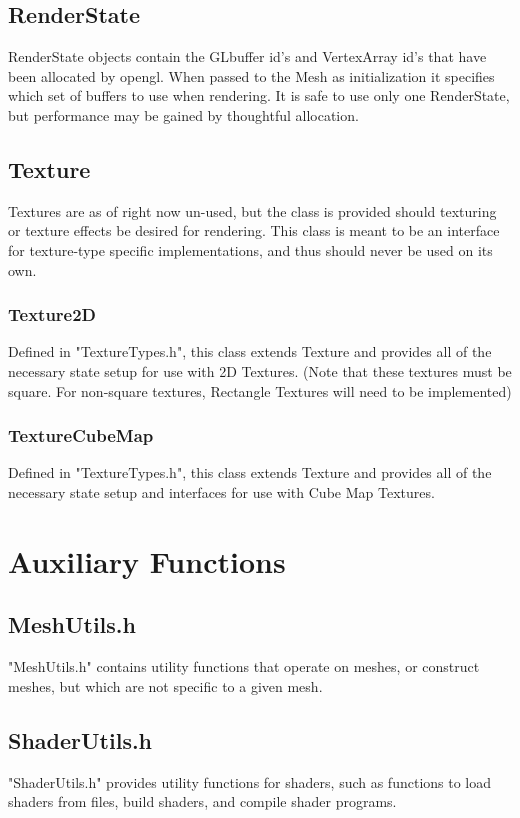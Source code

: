 \documentclass{article}
\begin{document}
\subsection{RenderState}
RenderState objects contain the GLbuffer id's and VertexArray id's that have been allocated by opengl. When passed to the Mesh as initialization it specifies which set of buffers to use when rendering. It is safe to use only one RenderState, but performance may be gained by thoughtful allocation.

\subsection{Texture}
Textures are as of right now un-used, but the class is provided should texturing or texture effects be desired for rendering. This class is meant to be an interface for texture-type specific implementations, and thus should never be used on its own.

\subsubsection{Texture2D}
Defined in "TextureTypes.h", this class extends Texture and provides all of the necessary state setup for use with 2D Textures. (Note that these textures must be square. For non-square textures, Rectangle Textures will need to be implemented)

\subsubsection{TextureCubeMap}
Defined in "TextureTypes.h", this class extends Texture and provides all of the necessary state setup and interfaces for use with Cube Map Textures.

\section{Auxiliary Functions}
\subsection{MeshUtils.h}
"MeshUtils.h" contains utility functions that operate on meshes, or construct meshes, but which are not specific to a given mesh.

\subsection{ShaderUtils.h}
"ShaderUtils.h" provides utility functions for shaders, such as functions to load shaders from files, build shaders, and compile shader programs.
\end{document}
